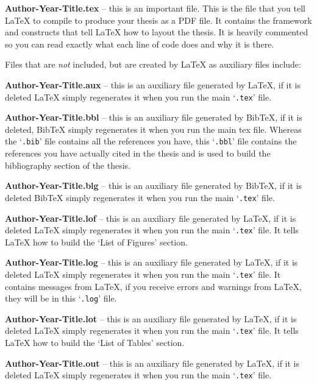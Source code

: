 \textbf{Author-Year-Title.tex} -- this is an important file. This is the file that you tell \LaTeX{} to compile to produce your thesis as a PDF file. It contains the framework and constructs that tell \LaTeX{} how to layout the thesis. It is heavily commented so you can read exactly what each line of code does and why it is there.

Files that are \emph{not} included, but are created by \LaTeX{} as auxiliary files include:

\textbf{Author-Year-Title.aux} -- this is an auxiliary file generated by \LaTeX{}, if it is deleted \LaTeX{} simply regenerates it when you run the main `\texttt{.tex}' file.

\textbf{Author-Year-Title.bbl} -- this is an auxiliary file generated by BibTeX, if it is deleted, BibTeX simply regenerates it when you run the main tex file. Whereas the `\texttt{.bib}' file contains all the references you have, this `\texttt{.bbl}' file contains the references you have actually cited in the thesis and is used to build the bibliography section of the thesis.

\textbf{Author-Year-Title.blg} -- this is an auxiliary file generated by BibTeX, if it is deleted BibTeX simply regenerates it when you run the main `\texttt{.tex}' file.

\textbf{Author-Year-Title.lof} -- this is an auxiliary file generated by \LaTeX{}, if it is deleted \LaTeX{} simply regenerates it when you run the main `\texttt{.tex}' file. It tells \LaTeX{} how to build the `List of Figures' section.

\textbf{Author-Year-Title.log} -- this is an auxiliary file generated by \LaTeX{}, if it is deleted \LaTeX{} simply regenerates it when you run the main `\texttt{.tex}' file. It contains messages from \LaTeX{}, if you receive errors and warnings from \LaTeX{}, they will be in this `\texttt{.log}' file.

\textbf{Author-Year-Title.lot} -- this is an auxiliary file generated by \LaTeX{}, if it is deleted \LaTeX{} simply regenerates it when you run the main `\texttt{.tex}' file. It tells \LaTeX{} how to build the `List of Tables' section.

\textbf{Author-Year-Title.out} -- this is an auxiliary file generated by \LaTeX{}, if it is deleted \LaTeX{} simply regenerates it when you run the main `\texttt{.tex}' file.


